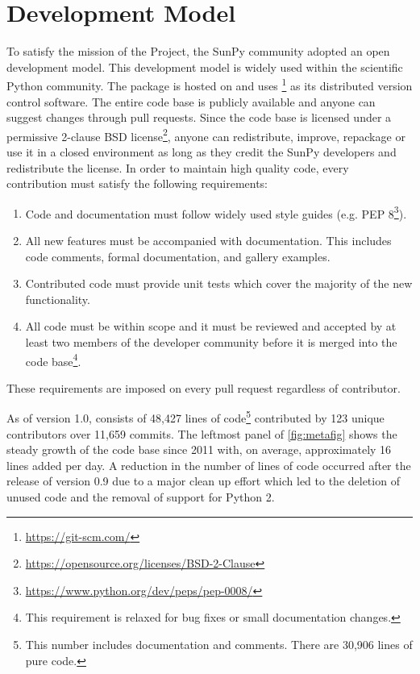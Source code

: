 \section{Development Model}
\label{sec:development}

To satisfy the mission of the Project, the SunPy community adopted an open development model.
This development model is widely used within the scientific Python community.
The \sunpypkg package is hosted on \github and uses \footnote{\url{https://git-scm.com/}} as its distributed version control software.
The entire code base is publicly available and anyone can suggest changes through pull requests.
Since the code base is licensed under a permissive 2-clause BSD license\footnote{\url{https://opensource.org/licenses/BSD-2-Clause}}, anyone can redistribute, improve, repackage or use it in a closed environment as long as they credit the SunPy developers and redistribute the license.
In order to maintain high quality code, every contribution must satisfy the following requirements:
\begin{enumerate}
    \item Code and documentation must follow widely used style guides (e.g. PEP 8\footnote{\url{https://www.python.org/dev/peps/pep-0008/}}).
    \item All new features must be accompanied with documentation.
    This includes code comments, formal documentation, and gallery examples.
    \item Contributed code must provide unit tests which cover the majority of the new functionality.
    \item All code must be within scope and it must be reviewed and accepted by at least two members of the developer community before it is merged into the code base\footnote{This requirement is relaxed for bug fixes or small documentation changes.}.
\end{enumerate}
These requirements are imposed on every pull request regardless of contributor.

As of version 1.0, \sunpypkg consists of 48,427 lines of code\footnote{This number includes documentation and comments.
There are 30,906 lines of pure code.} contributed by 123 unique contributors over 11,659 \git commits.
The leftmost panel of \autoref{fig:metafig} shows the steady growth of the code base since 2011 with, on average, approximately 16 lines added per day.
A reduction in the number of lines of code occurred after the release of version 0.9 due to a major clean up effort which led to the deletion of unused code and the removal of support for Python 2.

